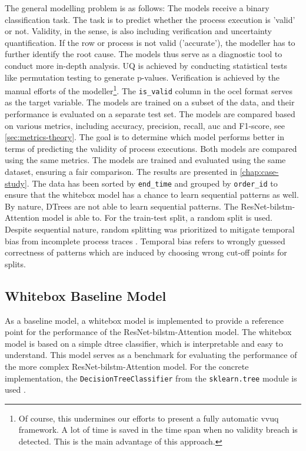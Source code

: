 The general modelling problem is as follows: The models receive a binary classification task. The task is to predict whether the process execution is 'valid' or not. Validity, in the sense, is also including verification and uncertainty quantification. If the row or process is not valid ('accurate'), the modeller has to further identify the root cause. The models thus serve as a diagnostic tool to conduct more in-depth analysis. UQ is achieved by conducting statistical tests like permutation testing to generate p-values. Verification is achieved by the manual efforts of the modeller\footnote{Of course, this undermines our efforts to present a fully automatic \gls{vvuq} framework. A lot of time is saved in the time span when no validity breach is detected. This is the main advantage of this approach.}. The \texttt{is\_valid} column in the \gls{ocel} format serves as the target variable. The models are trained on a subset of the data, and their performance is evaluated on a separate test set. The models are compared based on various metrics, including accuracy, precision, recall, \gls{auc} and F1-score, see \autoref{sec:metrics-theory}. The goal is to determine which model performs better in terms of predicting the validity of process executions. Both models are compared using the same metrics. The models are trained and evaluated using the same dataset, ensuring a fair comparison. The results are presented in \autoref{chap:case-study}. The data has been sorted by \texttt{end\_time} and grouped by \texttt{order\_id} to ensure that the whitebox model has a chance to learn sequential patterns as well. By nature, DTrees are not able to learn sequential patterns. The ResNet-\gls{bilstm}-Attention model is able to. For the train-test split, a random split is used. Despite sequential nature, random splitting was prioritized to mitigate temporal bias from incomplete process traces \autocite{morita2022investigation}. Temporal bias refers to wrongly guessed correctness of patterns which are induced by choosing wrong cut-off points for splits.


\subsection{Whitebox Baseline Model}
As a baseline model, a whitebox model is implemented to provide a reference point for the performance of the ResNet-\gls{bilstm}-Attention model. The whitebox model is based on a simple \gls{dtree} classifier, which is interpretable and easy to understand. This model serves as a benchmark for evaluating the performance of the more complex ResNet-\gls{bilstm}-Attention model. For the concrete implementation, the \texttt{DecisionTreeClassifier} from the \texttt{sklearn.tree} module is used \autocite{Scikit-Learn}.

